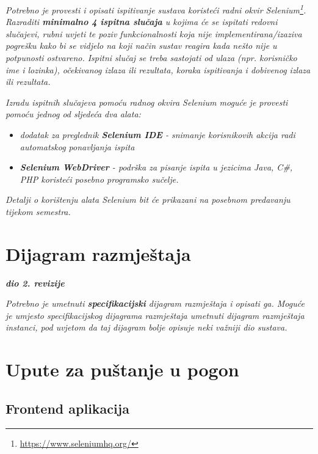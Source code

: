 			 \textit{Potrebno je provesti i opisati ispitivanje sustava koristeći radni okvir Selenium\footnote{\url{https://www.seleniumhq.org/}}. Razraditi \textbf{minimalno 4 ispitna slučaja} u kojima će se ispitati redovni slučajevi, rubni uvjeti te poziv funkcionalnosti koja nije implementirana/izaziva pogrešku kako bi se vidjelo na koji način sustav reagira kada nešto nije u potpunosti ostvareno. Ispitni slučaj se treba sastojati od ulaza (npr. korisničko ime i lozinka), očekivanog izlaza ili rezultata, koraka ispitivanja i dobivenog izlaza ili rezultata.\\ }
			 
			 \textit{Izradu ispitnih slučajeva pomoću radnog okvira Selenium moguće je provesti pomoću jednog od sljedeća dva alata:}
			 \begin{itemize}
			 	\item \textit{dodatak za preglednik \textbf{Selenium IDE} - snimanje korisnikovih akcija radi automatskog ponavljanja ispita	}
			 	\item \textit{\textbf{Selenium WebDriver} - podrška za pisanje ispita u jezicima Java, C\#, PHP koristeći posebno programsko sučelje.}
			 \end{itemize}
		 	\textit{Detalji o korištenju alata Selenium bit će prikazani na posebnom predavanju tijekom semestra.}
			
			\eject 
		
		
		\section{Dijagram razmještaja}
			
			\textbf{\textit{dio 2. revizije}}
			
			 \textit{Potrebno je umetnuti \textbf{specifikacijski} dijagram razmještaja i opisati ga. Moguće je umjesto specifikacijskog dijagrama razmještaja umetnuti dijagram razmještaja instanci, pod uvjetom da taj dijagram bolje opisuje neki važniji dio sustava.}
			
			\eject 
		
		\section{Upute za puštanje u pogon}
				
			\subsection{Frontend aplikacija}
			
